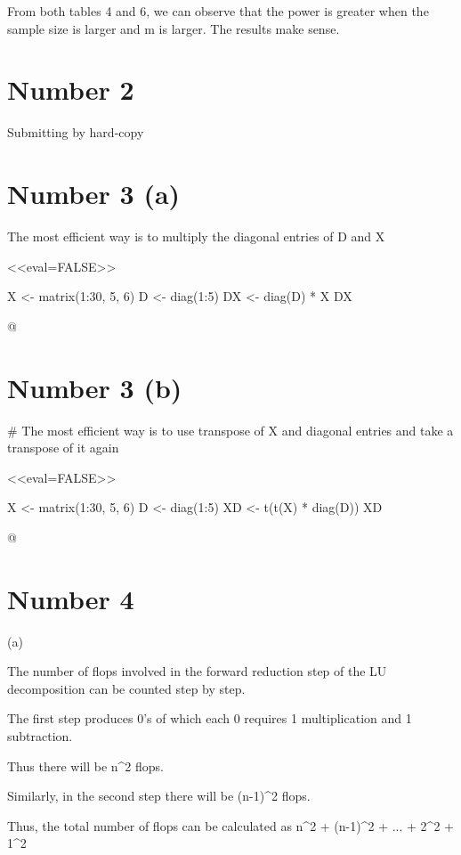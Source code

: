 \documentclass[english]{article}\usepackage[]{graphicx}\usepackage[]{color}
\begin{document}
From both tables 4 and 6, we can observe that the power is greater
when the sample size is larger and m is larger. The results make sense. 


\section*{Number 2}

Submitting by hard-copy


\section*{Number 3 (a)}

The most efficient way is to multiply the diagonal entries of D and
X 

<<eval=FALSE>>


X <- matrix(1:30, 5, 6) 
D <- diag(1:5) 
DX <- diag(D) * X 
DX

@


\section*{Number 3 (b)}

\# The most efficient way is to use transpose of X and diagonal entries
and take a transpose of it again

<<eval=FALSE>>

 
X <- matrix(1:30, 5, 6) 
D <- diag(1:5) 
XD <- t(t(X) * diag(D)) 
XD

@


\section*{Number 4}

(a)

The number of flops involved in the forward reduction step of the
LU decomposition can be counted step by step.



The first step produces 0's of which each 0 requires 1 multiplication
and 1 subtraction.

Thus there will be n\textasciicircum{}2 flops.



Similarly, in the second step there will be (n-1)\textasciicircum{}2
flops.



Thus, the total number of flops can be calculated as n\textasciicircum{}2
+ (n-1)\textasciicircum{}2 + ... + 2\textasciicircum{}2 + 1\textasciicircum{}2
\end{document}

